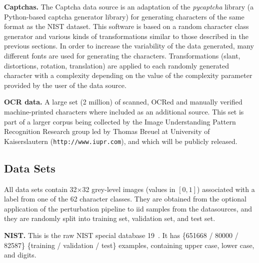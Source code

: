 \documentclass{article} %
\begin{document}
{\bf Captchas.}
The Captcha data source is an adaptation of the \emph{pycaptcha} library (a Python-based captcha generator library) for 
generating characters of the same format as the NIST dataset. This software is based on
a random character class generator and various kinds of transformations similar to those described in the previous sections. 
In order to increase the variability of the data generated, many different fonts are used for generating the characters. 
Transformations (slant, distortions, rotation, translation) are applied to each randomly generated character with a complexity
depending on the value of the complexity parameter provided by the user of the data source. 
\vspace*{-1mm}

{\bf OCR data.}
A large set (2 million) of scanned, OCRed and manually verified machine-printed 
characters where included as an
additional source. This set is part of a larger corpus being collected by the Image Understanding
Pattern Recognition Research group led by Thomas Breuel at University of Kaiserslautern 
({\tt http://www.iupr.com}), and which will be publicly released.

\vspace*{-3mm}
\subsection{Data Sets}
\vspace*{-2mm}

All data sets contain 32$\times$32 grey-level images (values in $[0,1]$) associated with a label
from one of the 62 character classes. They are obtained from the optional application of the
perturbation pipeline to iid samples from the datasources, and they are randomly split into 
training set, validation set, and test set.
\vspace*{-1mm}

{\bf NIST.} This is the raw NIST special database 19~\citep{Grother-1995}. It has
\{651668 / 80000 / 82587\} \{training / validation / test\} examples, containing
upper case, lower case, and digits.
\vspace*{-1mm}
\end{document}

